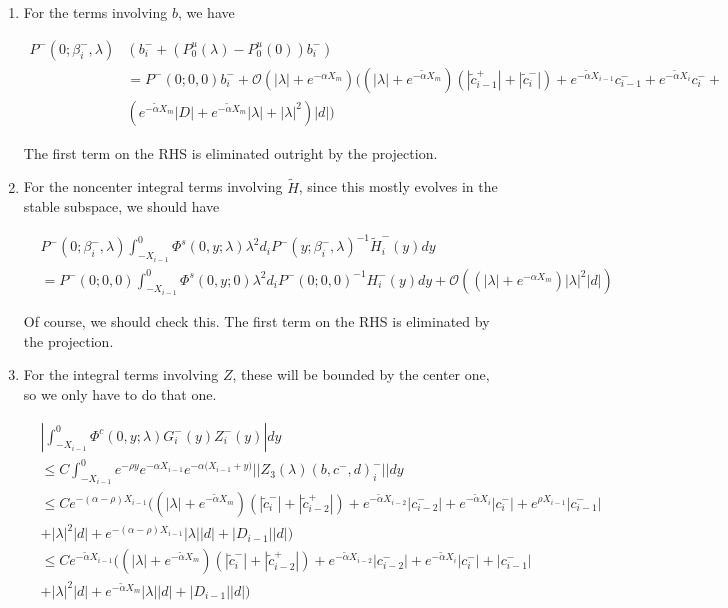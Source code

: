 \documentclass[12pt]{article}
\begin{document}
\begin{enumerate}
\item For the terms involving $b$, we have

\begin{align*}
P^-(0; \beta_i^-, \lambda)&( b_i^- + (P_0^u(\lambda) - P_0^u(0))b_i^-) \\
&= P^-(0; 0, 0) b_i^- + \mathcal{O}(|\lambda| + e^{-\alpha X_m})\Big( 
(|\lambda| + e^{-\tilde{\alpha}X_m})( |\tilde{c}_{i-1}^+| + |\tilde{c}_i^-|)
+ e^{-\tilde{\alpha} X_{i-1}} c_{i-1}^- + e^{-\tilde{\alpha} X_i} c_i^- + \\
&( e^{-\tilde{\alpha}X_m} |D| + e^{-\tilde{\alpha}X_m}|\lambda| + |\lambda|^2)|d| \Big)
\end{align*}

The first term on the RHS is eliminated outright by the projection.

\item For the noncenter integral terms involving $\tilde{H}$, since this mostly evolves in the stable subspace, we should have

\begin{align*}
&P^-(0; \beta_i^-, \lambda) 
\int_{-X_{i-1}}^0 \Phi^s(0, y; \lambda) \lambda^2 d_i P^-(y; \beta_i^-, \lambda)^{-1} \tilde{H}_i^-(y) dy \\
&= P^-(0; 0, 0) 
\int_{-X_{i-1}}^0 \Phi^s(0, y; 0) \lambda^2 d_i P^-(0; 0, 0)^{-1} H_i^-(y) dy + \mathcal{O}((|\lambda| + e^{-\alpha X_m})|\lambda|^2|d|) 
\end{align*}
 
Of course, we should check this. The first term on the RHS is eliminated by the projection.

\item For the integral terms involving $Z$, these will be bounded by the center one, so we only have to do that one.

\begin{align*}
&\left| \int_{-X_{i-1}}^0 \Phi^c(0, y; \lambda) G_i^-(y)Z_i^-(y) \right| dy \\ 
&\leq C \int_{-X_{i-1}}^0 e^{-\rho y} e^{-\alpha X_{i-1}}e^{-\alpha({X_{i-1} + y)}}||Z_3(\lambda)(b,c^-,d)_i^-|| dy \\
&\leq C e^{-(\alpha - \rho)X_{i-1}} ( (|\lambda| + e^{-\tilde{\alpha}X_m})(|\tilde{c}_i^-| + |\tilde{c}_{i-2}^+|) + e^{-\tilde{\alpha} X_{i-2}} |c_{i-2}^-| + e^{-\tilde{\alpha} X_i} |c_i^-| + e^{\rho X_{i-1}}|c_{i-1}^-| \\ 
&+ |\lambda|^2 |d| + e^{-(\alpha - \rho)X_{i-1}}|\lambda||d| + |D_{i-1}||d| ) \\
&\leq C e^{-\tilde{\alpha} X_{i-1}} ( (|\lambda| + e^{-\tilde{\alpha}X_m})(|\tilde{c}_i^-| + |\tilde{c}_{i-2}^+|) + e^{-\tilde{\alpha} X_{i-2}} |c_{i-2}^-| + e^{-\tilde{\alpha} X_i} |c_i^-| + |c_{i-1}^-| \\ 
&+ |\lambda|^2 |d| + e^{-\tilde{\alpha}X_m}|\lambda||d| + |D_{i-1}||d| )
\end{align*}


\end{enumerate}
\end{document}
